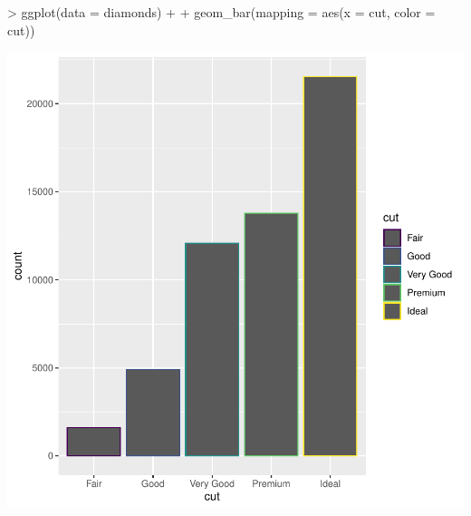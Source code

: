 \documentclass{article}
\begin{document}
\begin{Schunk}
\begin{Sinput}
> ggplot(data = diamonds) +
+ geom_bar(mapping = aes(x = cut, color = cut))
\end{Sinput}
\end{Schunk}
\includegraphics{tidigg-008}
\end{document}
